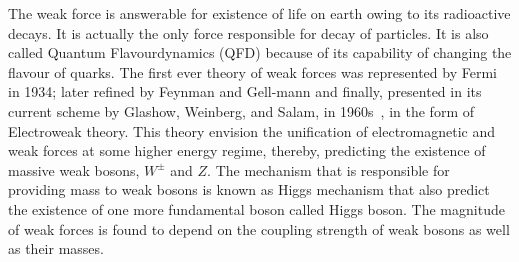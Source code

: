 
The weak force is answerable for existence of life on earth owing to its radioactive decays. It is actually the only force responsible for decay of particles.
It is also called Quantum Flavourdynamics (QFD) because of its capability of changing the flavour of quarks.
The first ever theory of weak forces was represented by Fermi in 1934;
later refined by Feynman and Gell-mann and finally, presented in its current scheme by Glashow, Weinberg, and Salam,
in 1960s~\cite{Glashow:1961tr, Salam:1964ry, Weinberg:1967tq}, in the form of Electroweak theory. This theory envision the unification of electromagnetic
and weak forces at some higher energy regime, thereby, predicting the existence of massive weak bosons, $W^{\pm}$ and $Z$.
The mechanism that is responsible for providing mass to weak bosons is known as Higgs mechanism that also predict the existence of one more fundamental boson called
Higgs boson. The magnitude of weak forces is found to depend on the coupling strength of weak bosons as well as their masses. 

